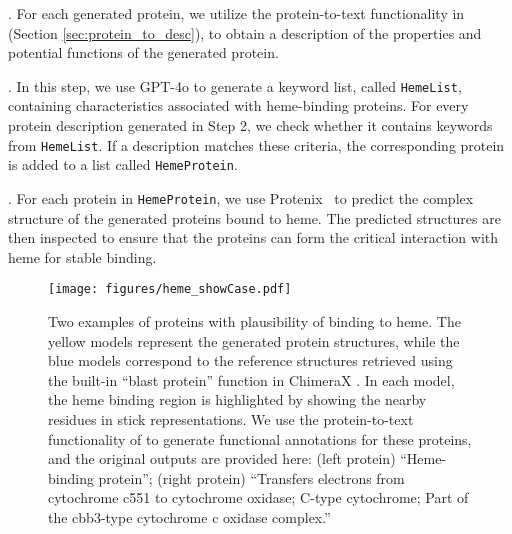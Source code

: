 . For each generated protein, we utilize the protein-to-text functionality in \ourM{} (Section \ref{sec:protein_to_desc}), to obtain a description of the properties and potential functions of the generated protein.

. In this step, we use GPT-4o to generate a keyword list, called \texttt{HemeList}, containing characteristics associated with heme-binding proteins. For every protein description generated in Step 2, we check whether it contains keywords from \texttt{HemeList}. If a description matches these criteria, the corresponding protein is added to a list called \texttt{HemeProtein}.

. For each protein in \texttt{HemeProtein}, we use Protenix~\cite{Protenix2025} to predict the complex structure of the generated proteins bound to heme. The predicted structures are then inspected to ensure that the proteins can form the critical interaction with heme for stable binding.

\begin{figure}[!htpb]
    \centering
    \texttt{[image: figures/heme\_showCase.pdf]}
    \caption{Two examples of proteins with plausibility of binding to heme. The yellow models represent the generated protein structures, while the blue models correspond to the reference structures retrieved using the built-in ``blast protein'' function in ChimeraX \cite{chimerax2023}. In each model, the heme binding region is highlighted by showing the nearby residues in stick representations. We use the protein-to-text functionality of \ourM{} to generate  functional annotations for these proteins, and the original outputs are provided here: (left protein) ``Heme-binding protein''; (right protein) ``Transfers electrons from cytochrome c551 to cytochrome oxidase; C-type cytochrome; Part of the cbb3-type cytochrome c oxidase complex.''}
    \label{fig:heme_bind_prot}
\end{figure}

